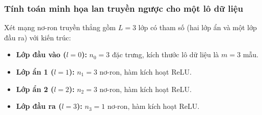 
\subsubsection{Tính toán minh họa lan truyền ngược cho một lô dữ liệu}
Xét mạng nơ-ron truyền thẳng gồm $L=3$ lớp có tham số (hai lớp ẩn và một lớp đầu ra) với kiến trúc:
\begin{itemize}
    \item \textbf{Lớp đầu vào ($l=0$):} $n_0 = 3$ đặc trưng, kích thước lô dữ liệu là $m = 3$ mẫu.
    \item \textbf{Lớp ẩn 1 ($l=1$):} $n_1 = 3$ nơ-ron, hàm kích hoạt ReLU.
    \item \textbf{Lớp ẩn 2 ($l=2$):} $n_2 = 3$ nơ-ron, hàm kích hoạt ReLU.
    \item \textbf{Lớp đầu ra ($l=3$):} $n_3 = 1$ nơ-ron, hàm kích hoạt ReLU.
\end{itemize}

